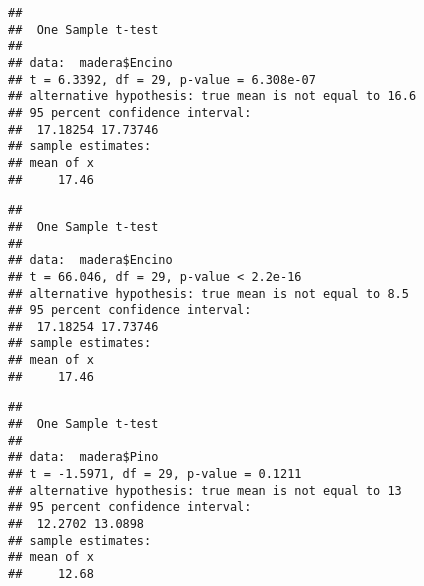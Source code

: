 \documentclass[
]{article}
\newenvironment{Shaded}{\begin{snugshade}}{\end{snugshade}}
\newcommand{\AttributeTok}[1]{\textcolor[rgb]{0.77,0.63,0.00}{#1}}
\newcommand{\CommentTok}[1]{\textcolor[rgb]{0.56,0.35,0.01}{\textit{#1}}}
\newcommand{\DecValTok}[1]{\textcolor[rgb]{0.00,0.00,0.81}{#1}}
\newcommand{\FloatTok}[1]{\textcolor[rgb]{0.00,0.00,0.81}{#1}}
\newcommand{\FunctionTok}[1]{\textcolor[rgb]{0.00,0.00,0.00}{#1}}
\newcommand{\NormalTok}[1]{#1}
\newcommand{\SpecialCharTok}[1]{\textcolor[rgb]{0.00,0.00,0.00}{#1}}
\begin{document}
\begin{Shaded}
\end{Shaded}

\begin{verbatim}
## 
##  One Sample t-test
## 
## data:  madera$Encino
## t = 6.3392, df = 29, p-value = 6.308e-07
## alternative hypothesis: true mean is not equal to 16.6
## 95 percent confidence interval:
##  17.18254 17.73746
## sample estimates:
## mean of x 
##     17.46
\end{verbatim}

\begin{Shaded}
\end{Shaded}

\begin{verbatim}
## 
##  One Sample t-test
## 
## data:  madera$Encino
## t = 66.046, df = 29, p-value < 2.2e-16
## alternative hypothesis: true mean is not equal to 8.5
## 95 percent confidence interval:
##  17.18254 17.73746
## sample estimates:
## mean of x 
##     17.46
\end{verbatim}

\begin{Shaded}
\end{Shaded}

\begin{verbatim}
## 
##  One Sample t-test
## 
## data:  madera$Pino
## t = -1.5971, df = 29, p-value = 0.1211
## alternative hypothesis: true mean is not equal to 13
## 95 percent confidence interval:
##  12.2702 13.0898
## sample estimates:
## mean of x 
##     12.68
\end{verbatim}
\end{document}
